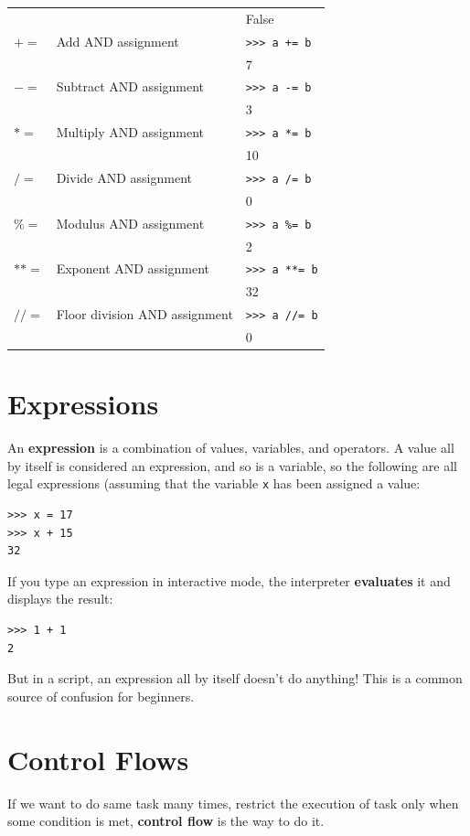\documentclass[10pt]{book}
\begin{document}
{\begin{tabular}{lll}
  &      & False \\
$+=$ & Add AND assignment & \verb">>> a += b" \\
  &      & 7 \\
$-=$ & Subtract AND assignment & \verb">>> a -= b" \\
  &      & 3 \\
 $*=$ & Multiply AND assignment & \verb">>> a *= b" \\
  &      & 10 \\
 $/=$ & Divide AND assignment & \verb">>> a /= b" \\
  &      & 0 \\
 $\%=$ & Modulus AND assignment & \verb">>> a %= b" \\
  &      & 2 \\
 $**=$ & Exponent AND assignment & \verb">>> a **= b" \\
  &      & 32 \\
 $//=$ & Floor division AND assignment & \verb">>> a //= b" \\
  &      & 0 \\
  \bottomrule
\end{tabular}


\section{Expressions}
An {\bf expression} is a combination of values, variables, and operators. A value all by itself is considered an expression, and so is a variable, so the following are all legal expressions (assuming that the variable \verb"x" has been assigned a value:

\beforeverb
\begin{verbatim}
>>> x = 17
>>> x + 15
32
\end{verbatim}
\afterverb

If you type an expression in interactive mode, the interpreter {\bf evaluates} it and displays the result:

\beforeverb
\begin{verbatim}
>>> 1 + 1
2
\end{verbatim}
\afterverb
%
But in a script, an expression all by itself doesn't do anything!  This is a common source of confusion for beginners.


\section{Control Flows}
If we want to do same task many times, restrict the execution of task only when some condition is met, {\bf control flow} is the way to do it. 

}
\end{document}
